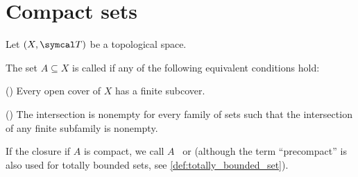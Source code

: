\section{Compact sets}\label{sec:compact_sets}

Let $(X, \Cal{T})$ be a topological space.

\begin{definition}\label{def:compact_set}\cite[40]{Deimling1985}
  The set $A \subseteq X$ is called  if any of the following equivalent conditions hold:
  \begin{defenum}
    \item\label{def:compact_set/union} () Every open cover of $X$ has a finite subcover.
    \item\label{def:compact_set/intersection} () The intersection is nonempty for every family of sets such that the intersection of any finite subfamily is nonempty.
  \end{defenum}

  If the closure if $A$ is compact, we call $A$~ or  (although the term \enquote{precompact} is also used for totally bounded sets, see \ref{def:totally_bounded_set}).
\end{definition}
